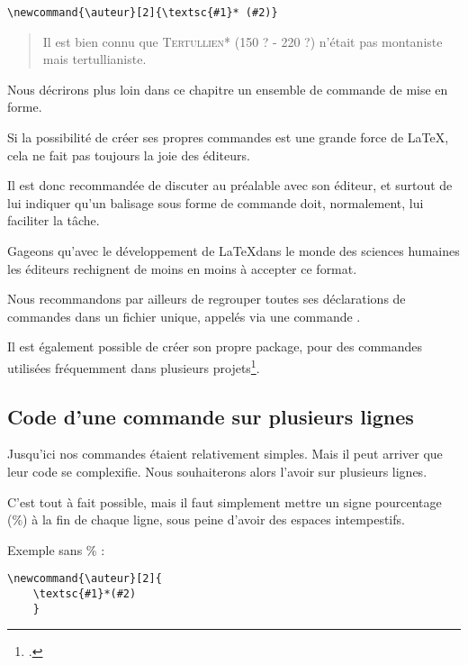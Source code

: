 \begin{verbatim}
\newcommand{\auteur}[2]{\textsc{#1}* (#2)}
\end{verbatim}

\renewcommand{\auteur}[2]{\textsc{#1}* (#2)}

\begin{quotation}
Il est bien connu que \auteur{Tertullien}{150 ? - 220 ?}
n'était pas montaniste mais tertullianiste.
\end{quotation}

Nous décrirons plus loin dans ce chapitre un ensemble de commande de mise en forme.

\begin{attention}
	Si la possibilité de créer ses propres commandes est une grande force de \LaTeX, cela ne fait pas toujours la joie des éditeurs. 
	
	Il est donc recommandée de discuter au préalable avec son éditeur, et surtout de lui indiquer qu'un balisage sous forme de commande doit, normalement, lui faciliter la tâche.
	
	Gageons qu'avec le développement  de \LaTeX dans le monde des sciences humaines les éditeurs rechignent de moins en moins à accepter ce format.
	
	Nous recommandons par ailleurs de regrouper toutes ses déclarations de commandes dans un fichier unique, appelés via une commande .
	
	Il est également possible de créer son propre package, pour des commandes utilisées fréquemment dans plusieurs projets\footcite[Ceci dépasserais le cadre de cet ouvrage : je renvois à d'autres documents. Par exemples][]{creer_sty}.
\end{attention}


\subsection{Code d'une commande sur plusieurs lignes}\label{commandepourcent}

Jusqu'ici nos commandes étaient relativement simples. Mais il peut arriver que leur code se complexifie. Nous souhaiterons alors l'avoir sur plusieurs lignes.

C'est tout à fait possible, mais il faut simplement mettre  un signe pourcentage (\%) à la fin de chaque ligne, sous peine d'avoir  des espaces intempestifs.

Exemple sans  \% :

\begin{verbatim}
\newcommand{\auteur}[2]{
	\textsc{#1}*(#2)
	}
\end{verbatim}

